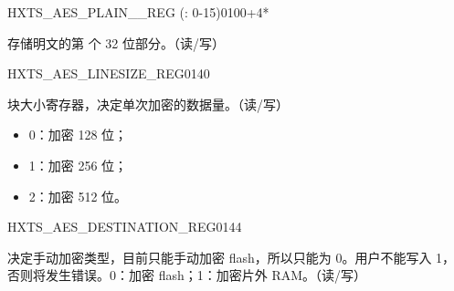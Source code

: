

\begin{register}{H}{XTS\_AES\_PLAIN\_\_REG (: 0-15)}{\hexprefix{}0100+4*}\label{regdesc:XTSAESPLAINNREG}
%
\regnewline%
\begin{regdesc}\begin{reglist}
\label{fielddesc:XTSAESPLAINN}\item [XTS\_AES\_PLAIN\_\regindex{n}] 存储明文的第  个 32 位部分。（读/写）
\end{reglist}\end{regdesc}
\end{register}



\begin{register}{H}{XTS\_AES\_LINESIZE\_REG}{\hexprefix{}0140}\label{regdesc:XTSAESLINESIZEREG}
%
%
\regnewline%
\begin{regdesc}\begin{reglist}
\item [XTS\_AES\_LINESIZE] 块大小寄存器，决定单次加密的数据量。（读/写）
    \begin{itemize}
        \item 0：加密 128 位；
        \item 1：加密 256 位；
        \item 2：加密 512 位。
    \end{itemize}
\end{reglist}\end{regdesc}
\end{register}


\begin{register}{H}{XTS\_AES\_DESTINATION\_REG}{\hexprefix{}0144}\label{regdesc:XTSAESDESTINATIONREG}
%
%
\regnewline%
\begin{regdesc}\begin{reglist}
\item [XTS\_AES\_DESTINATION] 决定手动加密类型，目前只能手动加密 flash，所以只能为 0。用户不能写入 1，否则将发生错误。0：加密 flash；1：加密片外 RAM。（读/写）

\end{reglist}\end{regdesc}
\end{register}


